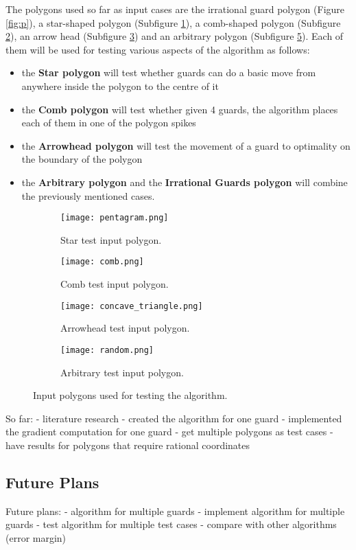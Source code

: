 The polygons used so far as input cases are the irrational guard polygon (Figure \ref{fig:p}), a star-shaped polygon (Subfigure \ref{fig:star}), a comb-shaped polygon (Subfigure \ref{fig:comb}), an arrow head (Subfigure \ref{fig:concave}) and an arbitrary polygon (Subfigure \ref{fig:random}). Each of them will be used for testing various aspects of the algorithm as follows:

\begin{itemize}
    \item the \textbf{Star polygon} will test whether guards can do a basic move from anywhere inside the polygon to the centre of it
    \item the \textbf{Comb polygon} will test whether given 4 guards, the algorithm places each of them in one of the polygon spikes
    \item the \textbf{Arrowhead polygon} will test the movement of a guard to optimality on the boundary of the polygon
    \item the \textbf{Arbitrary polygon} and the \textbf{Irrational Guards polygon} will combine the previously mentioned cases.
\end{itemize}

\begin{figure}
    \centering
    \begin{subfigure}{0.45\textwidth}
        \centering
        \texttt{[image: pentagram.png]}
        \caption{Star test input polygon.}
        \label{fig:star}
    \end{subfigure}
    \begin{subfigure}{0.45\textwidth}
        \centering
        \texttt{[image: comb.png]}
        \caption{Comb test input polygon.}
        \label{fig:comb}
    \end{subfigure}
    \begin{subfigure}{0.45\textwidth}
        \centering
        \texttt{[image: concave\_triangle.png]}
        \caption{Arrowhead test input polygon.}
        \label{fig:concave}
    \end{subfigure}
    \begin{subfigure}{0.45\textwidth}
        \centering
        \texttt{[image: random.png]}
        \caption{Arbitrary test input polygon.}
        \label{fig:random}
    \end{subfigure}
    \caption{Input polygons used for testing the algorithm.}
\end{figure}

So far:
- literature research
- created the algorithm for one guard
- implemented the gradient computation for one guard
- get multiple polygons as test cases
- have results for polygons that require rational coordinates

\subsection{Future Plans}
Future plans:
- algorithm for multiple guards
- implement algorithm for multiple guards
- test algorithm for multiple test cases 
- compare with other algorithms (error margin)